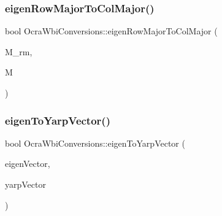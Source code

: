 \hypertarget{classocra__icub_1_1OcraWbiConversions_ac03ed9581c49479b3ade94d58a3295b4}{}\label{classocra__icub_1_1OcraWbiConversions_ac03ed9581c49479b3ade94d58a3295b4} 
\subsubsection{\texorpdfstring{eigen\+Row\+Major\+To\+Col\+Major()}{eigenRowMajorToColMajor()}}
{\footnotesize\ttfamily bool Ocra\+Wbi\+Conversions\+::eigen\+Row\+Major\+To\+Col\+Major (\begin{DoxyParamCaption}\item[{const \hyperlink{namespaceocra__icub_aa5e36a19ed031c28ca83c207bd7dd83f}{Matrix\+Xd\+Rm} \&}]{M\+\_\+rm,  }\item[{Eigen\+::\+Matrix\+Xd \&}]{M }\end{DoxyParamCaption})\hspace{0.3cm}{\ttfamily [static]}}

\hypertarget{classocra__icub_1_1OcraWbiConversions_a1197be5b35329fbec85de8ee3c4abbd5}{}\label{classocra__icub_1_1OcraWbiConversions_a1197be5b35329fbec85de8ee3c4abbd5} 
\subsubsection{\texorpdfstring{eigen\+To\+Yarp\+Vector()}{eigenToYarpVector()}}
{\footnotesize\ttfamily bool Ocra\+Wbi\+Conversions\+::eigen\+To\+Yarp\+Vector (\begin{DoxyParamCaption}\item[{const Eigen\+::\+Vector\+Xd \&}]{eigen\+Vector,  }\item[{yarp\+::sig\+::\+Vector \&}]{yarp\+Vector }\end{DoxyParamCaption})\hspace{0.3cm}{\ttfamily [static]}}

\hypertarget{classocra__icub_1_1OcraWbiConversions_a7725aea95eb71c805def4a064a2693fa}{}\label{classocra__icub_1_1OcraWbiConversions_a7725aea95eb71c805def4a064a2693fa} 
